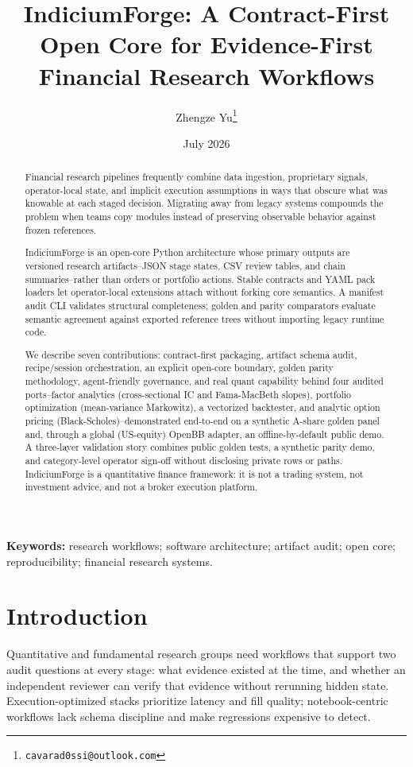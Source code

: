 \documentclass[11pt]{article}
\title{IndiciumForge: A Contract-First Open Core for Evidence-First Financial Research Workflows}
\author{Zhengze Yu\thanks{\texttt{cavarad0ssi@outlook.com}}}
\date{July 2026}
\begin{document}
\maketitle

\begin{abstract}
Financial research pipelines frequently combine data ingestion, proprietary signals,
operator-local state, and implicit execution assumptions in ways that obscure what was
knowable at each staged decision. Migrating away from legacy systems compounds the problem
when teams copy modules instead of preserving observable behavior against frozen references.

IndiciumForge is an open-core Python architecture whose primary outputs are versioned
research artifacts--JSON stage states, CSV review tables, and chain summaries--rather
than orders or portfolio actions. Stable contracts and YAML pack loaders let operator-local
extensions attach without forking core semantics. A manifest audit CLI validates structural
completeness; golden and parity comparators evaluate semantic agreement against exported
reference trees without importing legacy runtime code.

We describe seven contributions: contract-first packaging, artifact schema audit,
recipe/session orchestration, an explicit open-core boundary, golden parity methodology,
agent-friendly governance, and real quant capability behind four audited ports--factor analytics (cross-sectional IC and Fama-MacBeth slopes), portfolio optimization (mean-variance Markowitz), a vectorized backtester, and analytic option pricing (Black-Scholes)--demonstrated end-to-end on a synthetic A-share golden panel and, through a global (US-equity) OpenBB adapter, an offline-by-default public demo. A three-layer
validation story combines public golden tests,
a synthetic parity demo, and category-level operator sign-off without disclosing private
rows or paths. IndiciumForge is a quantitative finance framework: it is not a trading system, not
investment advice, and not a broker execution platform.
\end{abstract}

\noindent\textbf{Keywords:} research workflows; software architecture; artifact audit;
open core; reproducibility; financial research systems.

\section{Introduction}

Quantitative and fundamental research groups need workflows that support two audit
questions at every stage: what evidence existed at the time, and whether an independent
reviewer can verify that evidence without rerunning hidden state. Execution-optimized stacks
prioritize latency and fill quality; notebook-centric workflows lack schema discipline and
make regressions expensive to detect.
\end{document}

